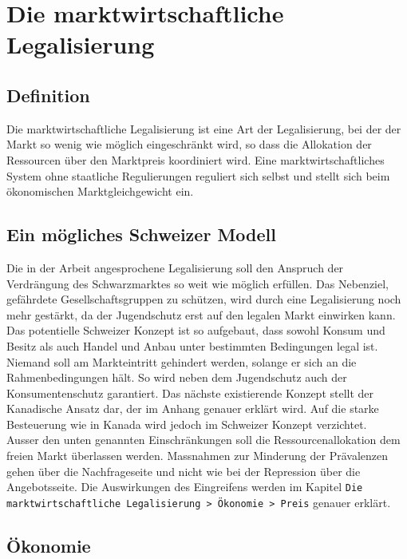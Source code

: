 \documentclass[../main.tex]{subfiles}
\begin{document}
	 \section{Die marktwirtschaftliche Legalisierung}
	 
	 \subsection{Definition}
	 Die marktwirtschaftliche Legalisierung ist eine Art der Legalisierung, bei der der Markt so wenig wie möglich eingeschränkt wird, so dass die Allokation der Ressourcen über den Marktpreis koordiniert wird.
	 Eine marktwirtschaftliches System ohne staatliche Regulierungen reguliert sich selbst und stellt sich beim ökonomischen Marktgleichgewicht ein.
	 
	 
	 
	 \subsection{Ein mögliches Schweizer Modell}
	 Die in der Arbeit angesprochene Legalisierung soll den Anspruch der Verdrängung des Schwarzmarktes so weit wie möglich erfüllen.
	 Das Nebenziel, gefährdete Gesellschaftsgruppen zu schützen, wird durch eine Legalisierung noch mehr gestärkt, da der Jugendschutz erst auf den legalen Markt einwirken kann.
	 Das potentielle Schweizer Konzept ist so aufgebaut, dass sowohl Konsum und Besitz als auch Handel und Anbau unter bestimmten Bedingungen legal ist.
	 Niemand soll am Markteintritt gehindert werden, solange er sich an die Rahmenbedingungen hält.
	 So wird neben dem Jugendschutz auch der Konsumentenschutz garantiert.
	 Das nächste existierende Konzept stellt der Kanadische Ansatz dar, der im Anhang genauer erklärt wird.
	 Auf die starke Besteuerung wie in Kanada wird jedoch im Schweizer Konzept verzichtet.\\
	 
	 \noindent
	 Ausser den unten genannten Einschränkungen soll die Ressourcenallokation dem freien Markt überlassen werden. 	 
	 Massnahmen zur Minderung der Prävalenzen gehen über die Nachfrageseite und nicht wie bei der Repression über die Angebotsseite.
	 Die Auswirkungen des Eingreifens werden im Kapitel \texttt{Die marktwirtschaftliche Legalisierung > Ökonomie > Preis} genauer erklärt.
	 
	 
	 \subsection{Ökonomie}
	 
\end{document}
